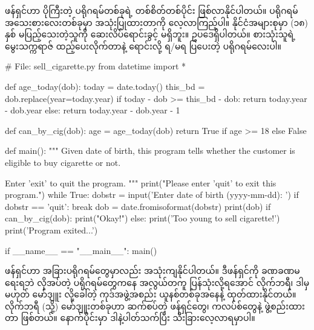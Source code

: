  ဖန်ရှင်ဟာ ပိုကြီးတဲ့ ပရိုဂရမ်တစ်ခုရဲ့ တစ်စိတ်တစ်ပိုင်း ဖြစ်လာနိုင်ပါတယ်။  ပရိုဂရမ် အသေးစားလေးတစ်ခုမှာ အသုံးပြုထားတာကို လေ့လာကြည့်ပါ။  နိုင်ငံအများစုမှာ (၁၈) နှစ် မပြည့်သေးတဲ့သူကို ဆေးလိပ်ရောင်းခွင့် မရှိဘူး။ ဥပဒေရှိပါတယ်။  စားသုံးသူရဲ့ မွေးသက္ကရာဇ် ထည့်ပေးလိုက်တာနဲ့ ရောင်းလို့ ရ/မရ ပြပေးတဲ့ ပရိုဂရမ်လေးပါ။ 
%
\begin{py}
# File: sell_cigarette.py
from datetime import *

def age_today(dob):
    today = date.today()
    this_bd = dob.replace(year=today.year)
    if today - dob >= this_bd - dob:
        return today.year - dob.year
    else:
        return today.year - dob.year - 1

def can_by_cig(dob):
    age = age_today(dob)
    return True if age >= 18 else False

def main():
    """
    Given date of birth, this program tells whether the customer
    is eligible to buy cigarette or not.

    Enter 'exit' to quit the program.
    """
    print("Please enter 'quit' to exit this program.")
    while True:
        dobstr = input('Enter date of birth (yyyy-mm-dd): ')
        if dobstr == 'quit': break
        dob = date.fromisoformat(dobstr)
        print(dob)
        if can_by_cig(dob):
            print("Okay!")
        else:
            print('Too young to sell cigarette!')
    print('Program exited...')


if __name__ == "__main__":
    main()
\end{py}
%

 ဖန်ရှင်ဟာ အခြားပရိုဂရမ်တွေမှာလည်း အသုံးကျနိုင်ပါတယ်။ ဒီဖန်ရှင်ကို ခဏခဏမရေးရဘဲ လိုအပ်တဲ့ ပရိုဂရမ်တွေကနေ အလွယ်တကူ ပြန်သုံးလို့ရအောင် လိုက်ဘရီ၊ ဒါမှမဟုတ် မော်ဒျူး လို့ခေါ်တဲ့ ကုဒ်အဖွဲ့အစည်း ယူနစ်တစ်ခုအနေနဲ့ ထုတ်ထားနိုင်တယ်။ လိုက်ဘရီ (သို့) မော်ဒျူးတစ်ခုဟာ ဆက်စပ်တဲ့ ဖန်ရှင်တွေ၊ ကလပ်စ်တွေနဲ့ ဖွဲ့စည်းထားတာ ဖြစ်တယ်။ နောက်ပိုင်းမှာ ဒါနဲ့ပါတ်သက်ပြီး သီးခြားလေ့လာရမှာပါ။  

